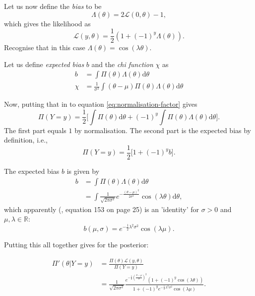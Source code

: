 \documentclass[]{report}
\begin{document}
Let us now define the \textit{bias} to be
\begin{equation}
    \Lambda ( \theta) = 2 \mathcal{L} (0, \theta) - 1,
\end{equation}
which gives the likelihood as
\begin{equation}
    \mathcal{L} (y, \theta) = \frac{1}{2}(1 + (-1)^{y} \Lambda(\theta)).
\end{equation}
Recognise that in this case $\Lambda(\theta) = \cos(\lambda \theta)$.


Let us define \textit{expected bias} $b$ and the \textit{chi function} $\chi$ as
\begin{align}
    b &= \int \Pi(\theta) \Lambda (\theta) \text{d} \theta\\
    \chi &= \frac{1}{\sigma^2} \int (\theta - \mu)\Pi(\theta) \Lambda (\theta) \text{d} \theta
\end{align}

Now, putting that in to equation \eqref{eq:normalisation-factor} gives
\begin{equation}
    \Pi(Y=y) = \frac{1}{2} \Big[ \int \Pi(\theta) \text{d}\theta + (-1)^y \int \Pi(\theta) \Lambda (\theta) \text{d} \theta \Big].
\end{equation}
The first part equals $1$ by normalisation. The second part is the expected bias by definition, i.e.,
\begin{equation}
     \Pi(Y=y) = \frac{1}{2} \Big[ 1 + (-1)^y b\Big].
\end{equation}

The expected bias $b$ is given by
\begin{align}
\label{eq:b}
    b   &= \int \Pi(\theta) \Lambda (\theta) \text{d} \theta\\
\label{eq:chi}
        &= \int \frac{1}{\sqrt{2\pi \sigma^2}} e^{-\frac{(\theta - \mu)^2}{2\sigma^2}} \cos(\lambda \theta) \text{d} \theta,
\end{align}
which apparently (\cite{Koh2020}, equation 153 on page 25) is an 'identity' for $\sigma > 0$ and $\mu, \lambda \in \mathbb{R}$:
\begin{equation}
\label{eq:b-gaussian}
    b(\mu, \sigma) = e^{-\frac{1}{2}\lambda^2\sigma^2} \cos (\lambda \mu).
\end{equation}


Putting this all together gives for the posterior:

\begin{align}
    \Pi'(\theta|Y = y)  &= \frac{\Pi(\theta) \mathcal{L} (y, \theta)}{\Pi(Y=y)}\\
    &= \frac{1}{\sqrt{2\pi \sigma^2}}\frac{e^{-\frac{1}{2}(\frac{\theta - \mu}{\sigma})^2} ( 1 + (-1)^y \cos(\lambda \theta))}{1 + (-1)^y e^{-\frac{1}{2}\lambda^2\sigma^2} \cos (\lambda \mu)}.
\end{align}
\end{document}
